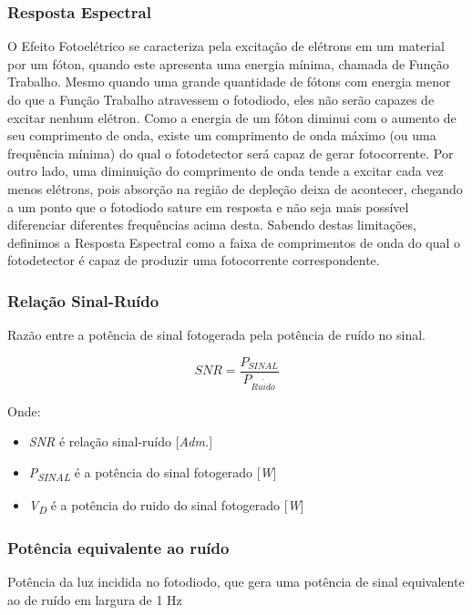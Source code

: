 \subsubsection{Resposta Espectral}
	O Efeito Fotoel\'etrico se caracteriza pela excitação de el\'etrons em um material por um fóton, quando este apresenta uma energia mínima, chamada de Função Trabalho. Mesmo quando uma grande quantidade de fótons com energia menor do que a Função Trabalho atravessem o fotodiodo, eles não serão capazes de excitar nenhum el\'etron. Como a energia de um fóton diminui com o aumento de seu comprimento de onda, existe um comprimento de onda máximo (ou uma frequência mínima) do qual o fotodetector será capaz de gerar fotocorrente.
	Por outro lado, uma diminuição do comprimento de onda tende a excitar cada vez menos el\'etrons, pois  absorção na região de depleção deixa de acontecer, chegando a um ponto que o fotodiodo sature em resposta e não seja mais possível diferenciar diferentes frequências acima desta.
Sabendo destas limitações, definimos a Resposta Espectral como a faixa de comprimentos de onda do qual o fotodetector \'e capaz de produzir uma fotocorrente correspondente.

\subsubsection{Relação Sinal-Ruído}
Razão entre a potência de sinal fotogerada pela pot\^encia de ru\'ido no sinal.

\begin{equation}
    SNR = \frac{P_{SINAL}}{P_{Ru\acute{i}do}}
\end{equation}

Onde:
\begin{itemize}
    \item \textit{SNR} \'e relação sinal-ru\'ido [\textit{Adm.}]
    \item \textit{P\textsubscript{SINAL}} \'e a pot\^encia do sinal fotogerado [\textit{W}]
    \item \textit{V\textsubscript{D}} \'e a pot\^encia do ruido do sinal fotogerado [\textit{W}]
\end{itemize}

\subsubsection{Pot\^encia equivalente ao ru\'ido}
Pot\^encia da luz incidida no fotodiodo, que gera uma potência de sinal equivalente ao de ruído em largura de 1 Hz

